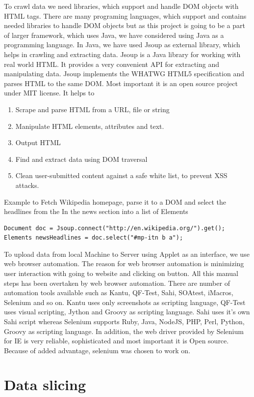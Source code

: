 \documentclass[12pt]{report}
\begin{document}
To crawl data we need libraries, which support and handle DOM objects with HTML tags. There are many programing languages, which support and contains needed libraries to handle DOM objects but as this project is going to be a part of larger framework, which uses Java, we have considered using Java as a programming language. In Java, we have used Jsoup as external library, which helps in crawling and extracting data. Jsoup is a Java library for working with real world HTML. It provides a very convenient API for extracting and manipulating data. Jsoup implements the WHATWG HTML5 specification and parses HTML to the same DOM. Most important it is an open source project under MIT license. It helps to
\begin{enumerate} [label=(\alph*)]
\item Scrape and parse HTML from a URL, file or string
\item Manipulate HTML elements, attributes and text.
\item Output HTML
\item Find and extract data using DOM traversal
\item Clean user-submitted content against a safe white list, to prevent XSS attacks.
\end{enumerate}

Example to Fetch Wikipedia homepage, parse it to a DOM and select the headlines from the In the news section into a list of Elements
\begin{verbatim}
Document doc = Jsoup.connect("http://en.wikipedia.org/").get();
Elements newsHeadlines = doc.select("#mp-itn b a");
\end{verbatim}
To upload data from local Machine to Server using Applet as an interface, we use web browser automation. The reason for web browser automation is minimizing user interaction with going to website and clicking on button. All this manual steps has been overtaken by web browser automation. There are number of automation tools available such as Kantu, QF-Test, Sahi, SOAtest, iMacros, Selenium and so on. Kantu uses only screenshots as scripting language, QF-Test uses visual scripting, Jython and Groovy as scripting language. Sahi uses it’s own Sahi script whereas Selenium supports Ruby, Java, NodeJS, PHP, Perl, Python, Groovy as scripting language. In addition, the web driver provided by Selenium for IE is very reliable, sophisticated and most important it is Open source. Because of added advantage, selenium was chosen to work on.

\section*{Data slicing}
\end{document}
